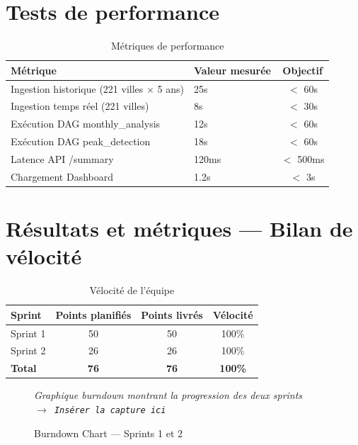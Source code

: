 \documentclass[a4paper,12pt,oneside]{report}
\newcommand{\imgplaceholder}[2]{%
  \begin{tcolorbox}[colback=blue!5,colframe=blue!40,title=#1]
    \centering\itshape #2\\[6pt]
    \texttt{$\rightarrow$ Insérer la capture ici}
  \end{tcolorbox}
}
\begin{document}
\section{Tests de performance}

\begin{table}[H]\centering\caption{Métriques de performance}\label{tab:perf}
\begin{tabularx}{\textwidth}{Xlc}\toprule
\textbf{Métrique} & \textbf{Valeur mesurée} & \textbf{Objectif} \\\midrule
Ingestion historique (221 villes $\times$ 5 ans) & 25s & $<$ 60s \\
Ingestion temps réel (221 villes) & 8s & $<$ 30s \\
Exécution DAG monthly\_analysis & 12s & $<$ 60s \\
Exécution DAG peak\_detection & 18s & $<$ 60s \\
Latence API /summary & 120ms & $<$ 500ms \\
Chargement Dashboard & 1.2s & $<$ 3s \\\bottomrule
\end{tabularx}\end{table}

\section{Résultats et métriques — Bilan de vélocité}

\begin{table}[H]\centering\caption{Vélocité de l'équipe}\label{tab:velocity}
\begin{tabularx}{\textwidth}{Xccc}\toprule
\textbf{Sprint} & \textbf{Points planifiés} & \textbf{Points livrés} & \textbf{Vélocité} \\\midrule
Sprint 1 & 50 & 50 & 100\% \\
Sprint 2 & 26 & 26 & 100\% \\\midrule
\textbf{Total} & \textbf{76} & \textbf{76} & \textbf{100\%} \\\bottomrule
\end{tabularx}\end{table}

\begin{figure}[H]\centering
\imgplaceholder{Burndown chart}{Graphique burndown montrant la progression des deux sprints}
\caption{Burndown Chart — Sprints 1 et 2}\label{fig:burndown}\end{figure}


\end{document}
